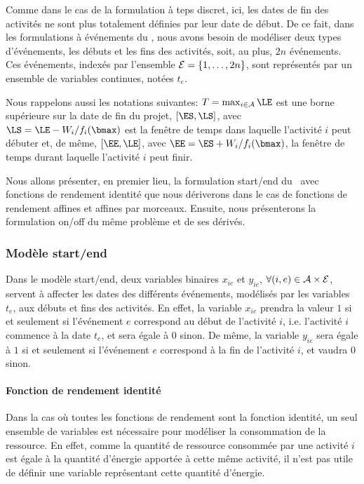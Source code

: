 Comme dans le cas de la formulation à teps discret, ici, les dates de
fin des activités ne sont plus totalement définies par leur date de
début. De ce fait, dans les formulations à événements du \CECSP, nous
avons 
besoin de modéliser deux types d'événements, les débuts et les fins
des activités, soit, au plus, $2n$ événements. Ces événements, indexés
par l'ensemble ${\cal E}=\{1,\dots,2n\}$, sont représentés par un
ensemble de variables continues, notées $t_e$.

Nous rappelons aussi les notations suivantes: $T=\max_{i \in \A}
\LE$ est une borne supérieure sur la date de fin du projet,
$[\ES,\LS]$, avec $\LS= \LE-W_i/f_i(\bmax)$ est la fenêtre de temps
dans laquelle l'activité $i$ peut débuter et, de même, $[\EE,\LE]$,
avec $\EE=\ES + W_i/f_i(\bmax)$, la fenêtre de temps durant laquelle
l'activité $i$ peut finir.

Nous allons présenter, en premier lieu, la formulation start/end du
\CECSP~avec fonctions de rendement identité que nous dériverons dans
le cas de fonctions de rendement affines et affines par morceaux.
Ensuite, nous présenterons la formulation on/off du même problème et
de ses dérivés.

\subsubsection{Modèle start/end}

Dans le modèle start/end, deux variables binaires $x_{ie}$ et
$y_{ie}$, $\forall (i,e) \in {\cal A}\times {\cal E}$, 
servent à affecter les dates des différents événements, modélisés par
les variables $t_e$, aux débuts et fins des activités. En effet, la
variable $x_{ie}$ prendra la valeur $1$ si et seulement si l'événement
$e$ correspond au début de l'activité $i$, i.e. l'activité $i$
commence à la date $t_e$, et sera égale à $0$ sinon. De même, la
variable $y_{ie}$ sera égale à $1$ si et seulement si l'événement $e$
correspond à la fin de l'activité $i$, et vaudra $0$ sinon.

\paragraph{Fonction de rendement identité}

Dans la cas où toutes les fonctions de rendement sont la fonction
identité, un seul ensemble de variables est nécessaire pour modéliser
la consommation de la ressource. En effet, comme la quantité de
ressource consommée par une activité $i$ est égale à la quantité
d'énergie apportée à cette même activité, il n'est pas utile de
définir une variable représentant cette quantité d'énergie.

